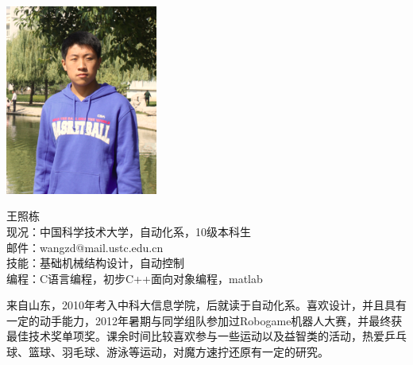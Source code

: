 

\begin{framed}
\noindent \includegraphics[width=50mm]{Figures/context.pic.png}
\parbox[b]{0.6\textwidth}{王照栋\\
现况：中国科学技术大学，自动化系，10级本科生\\
邮件：wangzd@mail.ustc.edu.cn\\
技能：基础机械结构设计，自动控制\\
编程：C语言编程，初步C++面向对象编程，matlab\\
}

来自山东，2010年考入中科大信息学院，后就读于自动化系。喜欢设计，并且具有一定的动手能力，2012年暑期与同学组队参加过Robogame机器人大赛，并最终获最佳技术奖单项奖。课余时间比较喜欢参与一些运动以及益智类的活动，热爱乒乓球、篮球、羽毛球、游泳等运动，对魔方速拧还原有一定的研究。
\end{framed}

